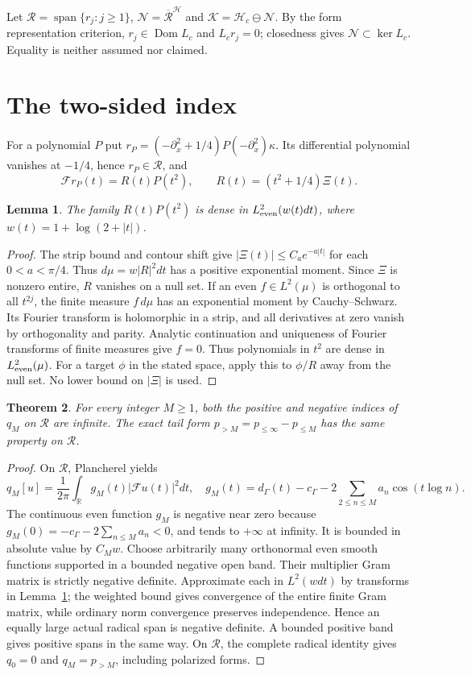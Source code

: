 \documentclass[11pt]{article}
\newtheorem{theorem}{Theorem}[section]
\newtheorem{lemma}[theorem]{Lemma}
\newcommand{\R}{\mathbb R}\newcommand{\C}{\mathbb C}\newcommand{\Hh}{\mathcal H}\newcommand{\Nn}{\mathcal N}\newcommand{\Kk}{\mathcal K}\newcommand{\norm}[1]{\lVert#1\rVert}\newcommand{\ip}[2]{\langle #1,#2\rangle}\newcommand{\dom}{\operatorname{Dom}}
\begin{document}
Let $\mathcal R=\operatorname{span}\{r_j:j\ge1\}$, $\Nn=\overline{\mathcal R}^{\Hh}$ and $\Kk=\Hh_c\ominus\Nn$. By the form representation criterion, $r_j\in\dom L_c$ and $L_cr_j=0$; closedness gives $\Nn\subset\ker L_c$. Equality is neither assumed nor claimed.

\section{The two-sided index}\label{index}
For a polynomial $P$ put $r_P=(-\partial_x^2+1/4)P(-\partial_x^2)\kappa$. Its differential polynomial vanishes at $-1/4$, hence $r_P\in\mathcal R$, and
\begin{equation}\label{fourier-r}
 \mathcal F r_P(t)=R(t)P(t^2),\qquad R(t)=(t^2+1/4)\Xi(t).
\end{equation}
\begin{lemma}\label{density}
The family $R(t)P(t^2)$ is dense in $L^2_{\rm even}(w(t)dt)$, where $w(t)=1+\log(2+|t|)$.
\end{lemma}
\begin{proof}
The strip bound and contour shift give $|\Xi(t)|\le C_a e^{-a|t|}$ for each $0<a<\pi/4$. Thus $d\mu=w|R|^2dt$ has a positive exponential moment. Since $\Xi$ is nonzero entire, $R$ vanishes on a null set. If an even $f\in L^2(\mu)$ is orthogonal to all $t^{2j}$, the finite measure $f\,d\mu$ has an exponential moment by Cauchy--Schwarz. Its Fourier transform is holomorphic in a strip, and all derivatives at zero vanish by orthogonality and parity. Analytic continuation and uniqueness of Fourier transforms of finite measures give $f=0$. Thus polynomials in $t^2$ are dense in $L^2_{\rm even}(\mu)$. For a target $\phi$ in the stated space, apply this to $\phi/R$ away from the null set. No lower bound on $|\Xi|$ is used.
\end{proof}
\begin{theorem}\label{thm:index}
For every integer $M\ge1$, both the positive and negative indices of $q_M$ on $\mathcal R$ are infinite. The exact tail form $p_{>M}=p_{\le\infty}-p_{\le M}$ has the same property on $\mathcal R$.
\end{theorem}
\begin{proof}
On $\mathcal R$, Plancherel yields
\[q_M[u]=\frac1{2\pi}\int_{\R}g_M(t)|\mathcal Fu(t)|^2dt,\quad
 g_M(t)=d_\Gamma(t)-c_\Gamma-2\sum_{2\le n\le M}a_n\cos(t\log n).\]
The continuous even function $g_M$ is negative near zero because $g_M(0)=-c_\Gamma-2\sum_{n\le M}a_n<0$, and tends to $+\infty$ at infinity. It is bounded in absolute value by $C_Mw$. Choose arbitrarily many orthonormal even smooth functions supported in a bounded negative open band. Their multiplier Gram matrix is strictly negative definite. Approximate each in $L^2(wdt)$ by transforms in Lemma~\ref{density}; the weighted bound gives convergence of the entire finite Gram matrix, while ordinary norm convergence preserves independence. Hence an equally large actual radical span is negative definite. A bounded positive band gives positive spans in the same way. On $\mathcal R$, the complete radical identity gives $q_0=0$ and $q_M=p_{>M}$, including polarized forms.
\end{proof}
\end{document}
